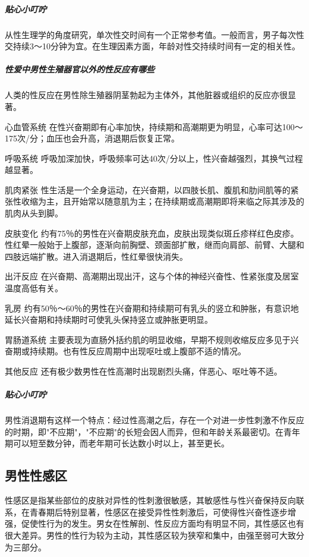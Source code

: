 \begin{enumerate}
\subparagraph{贴心小叮咛}

从性生理学的角度研究，单次性交时间有一个正常参考值。一般而言，男子每次性交持续3～10分钟为宜。在生理因素方面，年龄对性交持续时间有一定的相关性。

\subparagraph{性爱中男性生殖器官以外的性反应有哪些}

人类的性反应在男性除生殖器阴茎勃起为主体外，其他脏器或组织的反应亦很显著。

心血管系统
在性兴奋期即有心率加快，持续期和高潮期更为明显，心率可达100～175次/分；血压也会升高，消退期后恢复正常。

呼吸系统
呼吸加深加快，呼吸频率可达40次/分以上，性兴奋越强烈，其换气过程越显著。

肌肉紧张
性生活是一个全身运动，在兴奋期，以四肢长肌、腹肌和肋间肌等的紧张性收缩为主，且开始常以随意肌为主；在持续期或高潮期即将来临之际其涉及的肌肉从头到脚。

皮肤变化
约有75％的男性在兴奋期皮肤充血，皮肤出现类似斑丘疹样红色皮疹。性红晕一般始于上腹部，逐渐向前胸壁、颈面部扩散，继而向肩部、前臂、大腿和四肢远端扩散。进入消退期后，性红晕很快消失。

出汗反应
在兴奋期、高潮期出现出汗，这与个体的神经兴奋性、性紧张度及居室温度高低有关。

乳房
约有50％～60％的男性在兴奋期和持续期可有乳头的竖立和肿胀，有意识地延长兴奋期和持续期时可使乳头保持竖立或肿胀更明显。

胃肠道系统
主要表现为直肠外括约肌的明显收缩，早期不规则收缩反应多见于兴奋期或持续期。也有性反应周期中出现呕吐或上腹部不适的情况。

其他反应
还有极少数男性在性高潮时出现剧烈头痛，伴恶心、呕吐等不适。

\subparagraph{贴心小叮咛}

男性消退期有这样一个特点：经过性高潮之后，存在一个对进一步性刺激不作反应的时期，即"不应期"，"不应期"的长短会因人而异，但和年龄关系最密切。在青年期可以短至数分钟，而老年期可长达数小时以上，甚至更长。

\subsection{男性性感区}

性感区是指某些部位的皮肤对异性的性刺激很敏感，其敏感性与性兴奋保持反向联系，在青春期后特别显著，性感区在接受异性性刺激后，可使得性兴奋性逐步增强，促使性行为的发生。男女在性解剖、性反应方面均有明显不同，其性感区也有很大差异。男性的性行为较为主动，其性感区较为狭窄和集中，由强至弱可大致分为三部分。


\end{enumerate}
